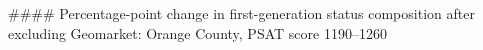 #### Percentage-point change in first-generation status composition after excluding Geomarket: Orange County, PSAT score 1190–1260
